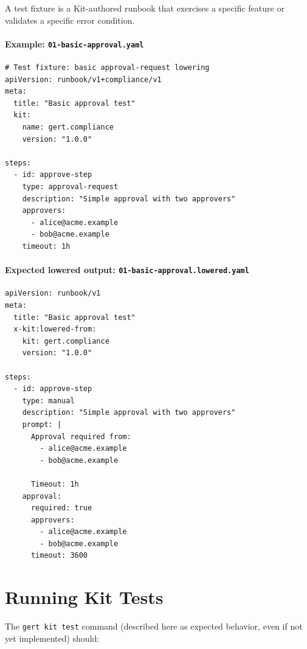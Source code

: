 A test fixture is a Kit-authored runbook that exercises a specific feature or
validates a specific error condition.

\paragraph{Example: \texttt{01-basic-approval.yaml}}

\begin{verbatim}
# Test fixture: basic approval-request lowering
apiVersion: runbook/v1+compliance/v1
meta:
  title: "Basic approval test"
  kit:
    name: gert.compliance
    version: "1.0.0"

steps:
  - id: approve-step
    type: approval-request
    description: "Simple approval with two approvers"
    approvers:
      - alice@acme.example
      - bob@acme.example
    timeout: 1h
\end{verbatim}

\paragraph{Expected lowered output: \texttt{01-basic-approval.lowered.yaml}}

\begin{verbatim}
apiVersion: runbook/v1
meta:
  title: "Basic approval test"
  x-kit:lowered-from:
    kit: gert.compliance
    version: "1.0.0"

steps:
  - id: approve-step
    type: manual
    description: "Simple approval with two approvers"
    prompt: |
      Approval required from:
        - alice@acme.example
        - bob@acme.example
      
      Timeout: 1h
    approval:
      required: true
      approvers:
        - alice@acme.example
        - bob@acme.example
      timeout: 3600
\end{verbatim}

\section{Running Kit Tests}
\label{sec:running-tests}

The \texttt{gert kit test} command (described here as expected behavior, even
if not yet implemented) should:

